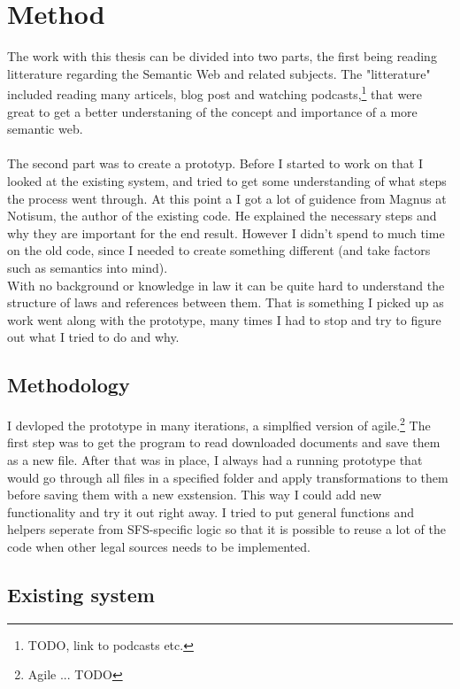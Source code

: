 \documentclass[a4paper,11pt]{kth-mag}
\begin{document}
\chapter{Method}

The work with this thesis can be divided into two parts, the first being reading litterature regarding the Semantic Web and related subjects. The "litterature" included reading many articels, blog post and watching podcasts,\footnote{TODO, link to podcasts etc.} that were great to get a better understaning of the concept and importance of a more semantic web.\\\\  
The second part was to create a prototyp. Before I started to work on that I looked at the existing system, and tried to get some understanding of what steps the process went through. At this point a I got a lot of guidence from Magnus at Notisum, the author of the existing code. He explained the necessary steps and why they are important for the end result. However I didn't spend to much time on the old code, since I needed to create something different (and take factors such as semantics into mind).\\ With no background or knowledge in law it can be quite hard to understand the structure of laws and references between them. That is something I picked up as work went along with the prototype, many times I had to stop and try to figure out what I tried to do and why. 

\section{Methodology}
I devloped the prototype in many iterations, a simplfied version of agile.\footnote{Agile ... TODO} The first step was to get the program to read downloaded documents and save them as a new file. After that was in place, I always had a running prototype that would go through all files in a specified folder and apply transformations to them before saving them with a new exstension. This way I could add new functionality and try it out right away. I tried to put general functions and helpers seperate from SFS-specific logic so that it is possible to reuse a lot of the code when other legal sources needs to be implemented.     

\section{Existing system}
\end{document}
